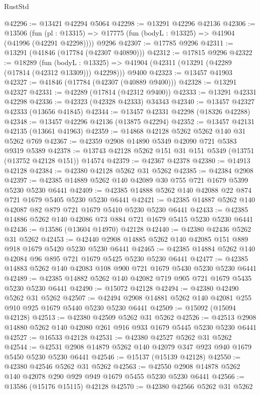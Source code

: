 \begin{lexlean}{RustStd}
\begin{coremodule}
@42296 := @13421 @42294 @5064
@42298 := @13291 @42296 @42136
@42306 := @13506
    (fun (pl : @13315) => @17775 (fun (bodyL : @13325) => @41904 (@41996 (@42291 @42298))))
    @9296
@42307 := @17785 @9296
@42311 := @13291 (@41846 (@17784 (@42307 @40890)))
@42312 := @17815 @9296
@42322 := @18289
    (fun (bodyL : @13325) => @41904 (@42311 (@13291 (@42289 (@17814 (@42312 @13309))) @42298)))
    @9400
@42323 := @13457 @41903
@42327 := @41846 (@17784 (@42307 (@40889 @9400)))
@42328 := @13291 @42327
@42331 := @42289 (@17814 (@42312 @9400))
@42333 := @13291 @42331 @42298
@42336 := @42323 (@42328 @42333) @34343
@42340 := @13457 @42327 @42333 (@13656 @41845)
@42344 := @13457 @42331 @42298 (@18326 @42288)
@42348 := @13457 @42296 @42136 (@13875 @42294)
@42352 := @13457 @42131 @42135 (@13661 @41963)
@42359 := @14868 @42128 @5262 @5262 @140 @31 @5262 @769
@42367 := @42359 @2908 @14890 @5349 @42090 @721 @5383 @9319 @5389
@42378 := @13743 @42128 @5262 @151 @31 @151 @5349 (@13751 (@13752 @42128 @151)) @14574
@42379 := @42367 @42378
@42380 := @14913 @42128
@42384 := @42380 @42128 @5262 @31 @5262
@42385 := @42384 @2908
@42397 := @42385 @14889 @5262 @140 @42089 @30 @755 @721 @1679 @5399 @5230 @5230 @6441
@42409 := @42385 @14888 @5262 @140 @42088 @22 @874 @721 @1679 @5405 @5230 @5230 @6441
@42421 := @42385 @14887 @5262 @140 @42087 @82 @879 @721 @1679 @5410 @5230 @5230 @6441
@42433 := @42385 @14886 @5262 @140 @42086 @73 @884 @721 @1679 @5415 @5230 @5230 @6441
@42436 := @13586 (@13604 @14970) @42128
@42440 := @42380 @42436 @5262 @31 @5262
@42453 := @42440 @2908 @14885 @5262 @140 @42085 @151 @889 @918 @1679 @5420 @5230 @5230 @6441
@42465 := @42385 @14884 @5262 @140 @42084 @96 @895 @721 @1679 @5425 @5230 @5230 @6441
@42477 := @42385 @14883 @5262 @140 @42083 @108 @900 @721 @1679 @5430 @5230 @5230 @6441
@42489 := @42385 @14882 @5262 @140 @42082 @719 @905 @721 @1679 @5435 @5230 @5230 @6441
@42490 := @15072 @42128
@42494 := @42380 @42490 @5262 @31 @5262
@42507 := @42494 @2908 @14881 @5262 @140 @42081 @255 @910 @925 @1679 @5440 @5230 @5230 @6441
@42509 := @15092 (@15094 @42128)
@42513 := @42380 @42509 @5262 @31 @5262
@42526 := @42513 @2908 @14880 @5262 @140 @42080 @261 @916 @933 @1679 @5445 @5230 @5230 @6441
@42527 := @16533 @42128
@42531 := @42380 @42527 @5262 @31 @5262
@42544 := @42531 @2908 @14879 @5262 @140 @42079 @347 @923 @940 @1679 @5450 @5230 @5230 @6441
@42546 := @15137 (@15139 @42128)
@42550 := @42380 @42546 @5262 @31 @5262
@42563 := @42550 @2908 @14878 @5262 @140 @42078 @290 @929 @949 @1679 @5455 @5230 @5230 @6441
@42566 := @13586 (@15176 @15115) @42128
@42570 := @42380 @42566 @5262 @31 @5262

\end{coremodule}
\end{lexlean}
